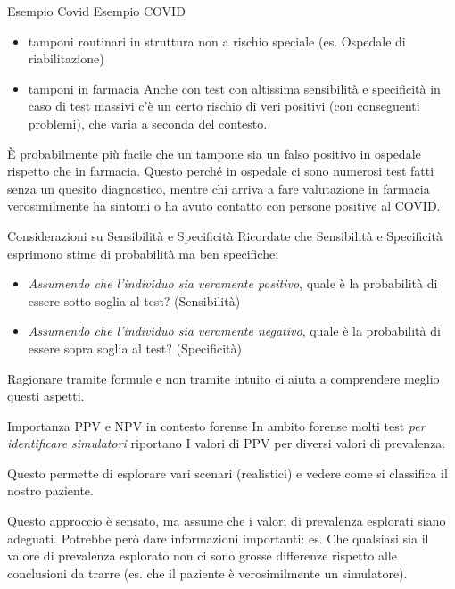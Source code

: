 \documentclass[
  ignorenonframetext,
]{beamer}
\providecommand{\tightlist}{%
  \setlength{\itemsep}{0pt}\setlength{\parskip}{0pt}}
\begin{document}
\begin{frame}{Esempio Covid}
\label{esempio-covid}
Esempio COVID

\begin{itemize}
\tightlist
\item
  tamponi routinari in struttura non a rischio speciale (es. Ospedale di
  riabilitazione)
\item
  tamponi in farmacia \pause Anche con test con altissima sensibilità e
  specificità in caso di test massivi c'è un certo rischio di veri
  positivi (con conseguenti problemi), che varia a seconda del contesto.
\end{itemize}

È probabilmente più facile che un tampone sia un falso positivo in
ospedale rispetto che in farmacia. Questo perché in ospedale ci sono
numerosi test fatti senza un quesito diagnostico, mentre chi arriva a
fare valutazione in farmacia verosimilmente ha sintomi o ha avuto
contatto con persone positive al COVID.
\end{frame}

\begin{frame}{Considerazioni su Sensibilità e Specificità}
\label{considerazioni-su-sensibilituxe0-e-specificituxe0}
Ricordate che Sensibilità e Specificità esprimono stime di probabilità
ma ben specifiche:

\begin{itemize}
\small
\item \emph{Assumendo che l'individuo sia veramente positivo}, quale è la probabilità di essere sotto soglia al test? (Sensibilità)
\item \emph{Assumendo che l'individuo sia veramente negativo}, quale è la probabilità di essere sopra soglia al test? (Specificità) 
\end{itemize}

Ragionare tramite formule e non tramite intuito ci aiuta a comprendere
meglio questi aspetti.
\end{frame}

\begin{frame}{Importanza PPV e NPV in contesto forense}
\label{importanza-ppv-e-npv-in-contesto-forense}
In ambito forense molti test \emph{per identificare simulatori}
riportano I valori di PPV per diversi valori di prevalenza.

Questo permette di esplorare vari scenari (realistici) e vedere come si
classifica il nostro paziente.

Questo approccio è sensato, ma assume che i valori di prevalenza
esplorati siano adeguati. Potrebbe però dare informazioni importanti:
es. Che qualsiasi sia il valore di prevalenza esplorato non ci sono
grosse differenze rispetto alle conclusioni da trarre (es. che il
paziente è verosimilmente un simulatore).
\end{frame}
\end{document}

